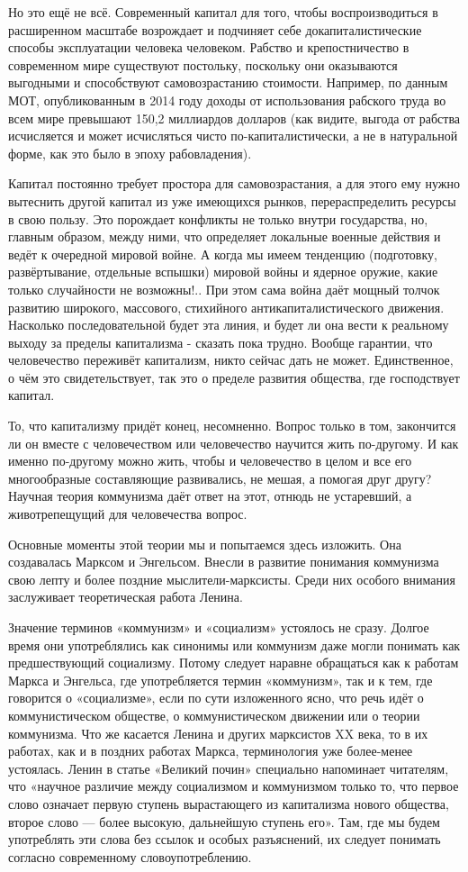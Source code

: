 \documentclass[../main]{subfiles}
\begin{document}
Но это ещё не всё. Современный капитал для того, чтобы воспроизводиться в расширенном масштабе возрождает и подчиняет себе докапиталистические способы эксплуатации человека человеком. Рабство и крепостничество в современном мире существуют постольку, поскольку они оказываются выгодными и способствуют самовозрастанию стоимости. Например, по данным МОТ, опубликованным в 2014 году доходы от использования рабского труда во всем мире превышают 150,2 миллиардов долларов (как видите, выгода от рабства исчисляется и может исчисляться чисто по-капиталистически, а не в натуральной форме, как это было в эпоху рабовладения).

Капитал постоянно требует простора для самовозрастания, а для этого ему нужно вытеснить другой капитал из уже имеющихся рынков, перераспределить ресурсы в свою пользу. Это порождает конфликты не только внутри государства, но, главным образом, между ними, что определяет локальные военные действия и ведёт к очередной мировой войне. А когда мы имеем тенденцию (подготовку, развёртывание, отдельные вспышки) мировой войны и ядерное оружие, какие только случайности не возможны!.. При этом сама война даёт мощный толчок развитию широкого, массового, стихийного антикапиталистического движения. Насколько последовательной будет эта линия, и будет ли она вести к реальному выходу за пределы капитализма - сказать пока трудно. Вообще гарантии, что человечество переживёт капитализм, никто сейчас дать не может. Единственное, о чём это свидетельствует, так это о пределе развития общества, где господствует капитал.

То, что капитализму придёт конец, несомненно. Вопрос только в том, закончится ли он вместе с человечеством или человечество научится жить по-другому. И как именно по-другому можно жить, чтобы и человечество в целом и все его многообразные составляющие развивались, не мешая, а помогая друг другу? Научная теория коммунизма даёт ответ на этот, отнюдь не устаревший, а животрепещущий для человечества вопрос.

Основные моменты этой теории мы и попытаемся здесь изложить. Она создавалась Марксом и Энгельсом. Внесли в развитие понимания коммунизма свою лепту и более поздние мыслители-марксисты. Среди них особого внимания заслуживает теоретическая работа Ленина.

Значение терминов «коммунизм» и «социализм» устоялось не сразу. Долгое время они употреблялись как синонимы или коммунизм даже могли понимать как предшествующий социализму. Потому следует наравне обращаться как к работам Маркса и Энгельса, где употребляется термин «коммунизм», так и к тем, где говорится о «социализме», если по сути изложенного ясно, что речь идёт о коммунистическом обществе, о коммунистическом движении или о теории коммунизма. Что же касается Ленина и других марксистов XX века, то в их работах, как и в поздних работах Маркса, терминология уже более-менее устоялась. Ленин в статье «Великий почин» специально напоминает читателям, что «научное различие между социализмом и коммунизмом только то, что первое слово означает первую ступень вырастающего из капитализма нового общества, второе слово — более высокую, дальнейшую ступень его». Там, где мы будем употреблять эти слова без ссылок и особых разъяснений, их следует понимать согласно современному словоупотреблению.
\end{document}
